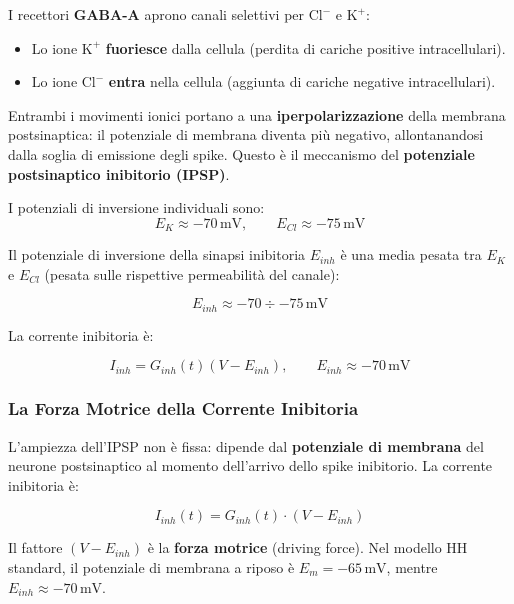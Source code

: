 I recettori \textbf{GABA-A} aprono canali selettivi per $\text{Cl}^-$ e $\text{K}^+$:
\begin{itemize}
    \item Lo ione $\text{K}^+$ \textbf{fuoriesce} dalla cellula (perdita di cariche positive intracellulari).
    \item Lo ione $\text{Cl}^-$ \textbf{entra} nella cellula (aggiunta di cariche negative intracellulari).
\end{itemize}

Entrambi i movimenti ionici portano a una \textbf{iperpolarizzazione} della membrana postsinaptica: il potenziale di membrana diventa più negativo, allontanandosi dalla soglia di emissione degli spike. Questo è il meccanismo del \textbf{potenziale postsinaptico inibitorio (IPSP)}.

I potenziali di inversione individuali sono:
\begin{equation}
E_K \approx -70 \, \text{mV}, \qquad E_{Cl} \approx -75 \, \text{mV}
\end{equation}

Il potenziale di inversione della sinapsi inibitoria $E_{inh}$ è una media pesata tra $E_K$ e $E_{Cl}$ (pesata sulle rispettive permeabilità del canale):

\begin{equation}
E_{inh} \approx -70 \div -75 \, \text{mV}
\end{equation}

La corrente inibitoria è:

\begin{equation}
I_{inh} = G_{inh}(t)(V - E_{inh}), \qquad E_{inh} \approx -70 \, \text{mV}
\end{equation}


\subsubsection{La Forza Motrice della Corrente Inibitoria}

L'ampiezza dell'IPSP non è fissa: dipende dal \textbf{potenziale di membrana} del neurone postsinaptico al momento dell'arrivo dello spike inibitorio. La corrente inibitoria è:

\begin{equation}
I_{inh}(t) = G_{inh}(t) \cdot (V - E_{inh})
\end{equation}

Il fattore $(V - E_{inh})$ è la \textbf{forza motrice} (driving force). Nel modello HH standard, il potenziale di membrana a riposo è $E_m = -65 \, \text{mV}$, mentre $E_{inh} \approx -70 \, \text{mV}$.

